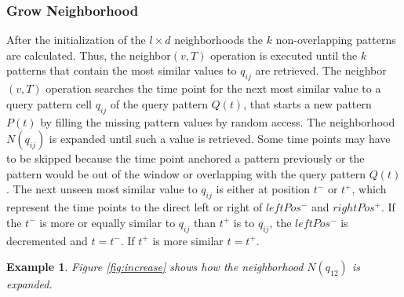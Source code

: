 \documentclass[abstracton,12pt]{scrreprt}
\newtheorem{example}{Example}
\begin{document}
\subsubsection{Grow Neighborhood}
After the initialization of the $l \times d$ neighborhoods the $k$ non-overlapping patterns are calculated. Thus, the neighbor$(v, T)$ operation is executed until the $k$ patterns that contain the most similar values to $q_{ij}$ are retrieved.
The neighbor$(v, T)$ operation searches the time point for the next most similar value to a query pattern cell $q_{ij}$ of the query pattern $Q(t)$, that starts a new pattern $P(t)$ by filling the missing pattern values by random access. The neighborhood $N(q_{ij})$ is expanded until such a value is retrieved. Some time points may have to be skipped because the time point anchored a pattern previously or the pattern would be out of the window or overlapping with the query pattern $Q(t)$. The next unseen most similar value to $q_{ij}$ is either at position $t^-$ or $t^+$, which represent the time points to the direct left or right of $leftPos^-$ and $rightPos^+$. If the $t^-$ is more or equally similar to $q_{ij}$ than $t^+$ is to $q_{ij}$, the $leftPos^-$ is decremented and $t=t^-$. If $t^+$ is more similar $t=t^+$.

\begin{example}
Figure \ref{fig:increase} shows how the neighborhood $N(q_{12})$ is expanded. 
\end{example}
\end{document}
